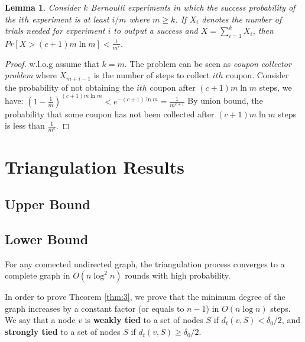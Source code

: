 \documentclass[
10pt, %
a4paper, %
oneside, %
headinclude,footinclude, %
BCOR5mm, %
]{scrartcl}
\newtheorem{lemma}[theorem]{\textbf{Lemma}}
\begin{document}
\begin{lemma}\label{lem:2}
	Consider $k$ Bernoulli experiments in which the success probability of the $ith$ experiment is at least $i/m$ where $m \geq k$. If $X_i$ denotes the number of trials needed for experiment $i$ to output a success and $X = \sum_{i=1}^{k}X_i$, then $Pr[X > (c+1)m\ln m] < \frac{1}{m^c}$.
\end{lemma}
\begin{proof}
	w.l.o.g assume that $k=m$. The problem can be seen as \textit{coupon collector problem} where $X_{m+i-1}$ is the number of steps to collect $ith$ coupon. Consider the probability of not obtaining the $ith$ coupon after $(c+1)m\ln m$ steps, we have:
	\begin{math}
		(1 - \frac{1}{m})^{(c+1) m \ln m} < e^{-(c+1)\ln m} = \frac{1}{m^{c+1}}
	\end{math}
	By union bound, the probability that some coupon has not been collected after $(c+1)m \ln m$ steps is less than $\frac{1}{m^c}$.
\end{proof}


\section{Triangulation Results}
\subsection{Upper Bound}
\subsection{Lower Bound}

\begin{theorem}\label{thm:3}
	For any connected undirected graph, the triangulation process converges to a complete graph in $O(n \log^2 n)$ rounds with high probability.
\end{theorem}
In order to prove Theorem \ref{thm:3}, we prove that the minimum degree of the graph increases by a constant factor (or equals to $n-1$) in $O(n\log n)$ steps. We say that a node $v$ is \textbf{weakly tied} to a set of nodes $S$ if $d_t(v, S) < \delta_0 / 2$, and \textbf{strongly tied} to a set of nodes $S$ if $d_t(v, S) \geq \delta_0 / 2$.
\end{document}

